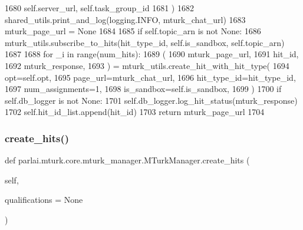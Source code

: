 \begin{DoxyCode}
1680             self.server\_url, self.task\_group\_id
1681         )
1682         shared\_utils.print\_and\_log(logging.INFO, mturk\_chat\_url)
1683         mturk\_page\_url = \textcolor{keywordtype}{None}
1684 
1685         \textcolor{keywordflow}{if} self.topic\_arn \textcolor{keywordflow}{is} \textcolor{keywordflow}{not} \textcolor{keywordtype}{None}:
1686             mturk\_utils.subscribe\_to\_hits(hit\_type\_id, self.is\_sandbox, self.topic\_arn)
1687 
1688         \textcolor{keywordflow}{for} \_i \textcolor{keywordflow}{in} range(num\_hits):
1689             (
1690                 mturk\_page\_url,
1691                 hit\_id,
1692                 mturk\_response,
1693             ) = mturk\_utils.create\_hit\_with\_hit\_type(
1694                 opt=self.opt,
1695                 page\_url=mturk\_chat\_url,
1696                 hit\_type\_id=hit\_type\_id,
1697                 num\_assignments=1,
1698                 is\_sandbox=self.is\_sandbox,
1699             )
1700             \textcolor{keywordflow}{if} self.db\_logger \textcolor{keywordflow}{is} \textcolor{keywordflow}{not} \textcolor{keywordtype}{None}:
1701                 self.db\_logger.log\_hit\_status(mturk\_response)
1702             self.hit\_id\_list.append(hit\_id)
1703         \textcolor{keywordflow}{return} mturk\_page\_url
1704 
\end{DoxyCode}
\mbox{\label{classparlai_1_1mturk_1_1core_1_1mturk__manager_1_1MTurkManager_acd01b6d3cd60d04e679b2bdab7b0a09d}} 
\subsubsection{\texorpdfstring{create\+\_\+hits()}{create\_hits()}}
{\footnotesize\ttfamily def parlai.\+mturk.\+core.\+mturk\+\_\+manager.\+M\+Turk\+Manager.\+create\+\_\+hits (\begin{DoxyParamCaption}\item[{}]{self,  }\item[{}]{qualifications = {\ttfamily None} }\end{DoxyParamCaption})}

